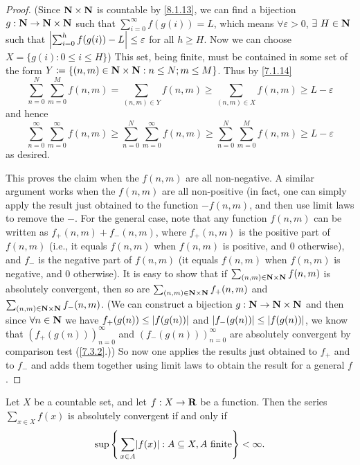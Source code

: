 \begin{proof}
  (Since \(\mathbf{N} \times \mathbf{N}\) is countable by \cref{8.1.13}, we can find a bijection \(g : \mathbf{N} \to \mathbf{N} \times \mathbf{N}\) such that \(\sum_{i = 0}^\infty f(g(i)) = L\), which means \(\forall \varepsilon > 0\), \(\exists\ H \in \mathbf{N}\) such that \(\left\lvert\sum_{i = 0}^h f(g(i)) - L\right\rvert \leq \varepsilon\) for all \(h \geq H\).
  Now we can choose \(X = \{g(i) : 0 \leq i \leq H\}\))
  This set, being finite, must be contained in some set of the form \(Y \coloneqq \{(n,m) \in \mathbf{N} \times \mathbf{N} : n \leq N; m \leq M \}\).
  Thus by \cref{7.1.14}
  \[
    \sum_{n = 0}^N \sum_{m = 0}^M f(n, m) = \sum_{(n, m) \in Y} f(n, m) \geq \sum_{(n, m) \in X} f(n, m) \geq L - \varepsilon
  \]
  and hence
  \[
    \sum_{n = 0}^\infty \sum_{m = 0}^\infty f(n, m) \geq \sum_{n = 0}^N \sum_{m = 0}^\infty f(n, m) \geq \sum_{n = 0}^N \sum_{m = 0}^M f(n, m) \geq L - \varepsilon
  \]
  as desired.

  This proves the claim when the \(f(n, m)\) are all non-negative.
  A similar argument works when the \(f(n, m)\) are all non-positive
  (in fact, one can simply apply the result just obtained to the function \(-f(n, m)\), and then use limit laws to remove the \(-\).
  For the general case, note that any function \(f(n, m)\) can be written as \(f_+(n, m) + f_-(n, m)\), where \(f_+(n, m)\) is the positive part of \(f(n, m)\)
  (i.e., it equals \(f(n, m)\) when \(f(n, m)\) is positive, and \(0\) otherwise),
  and \(f_-\) is the negative part of \(f(n, m)\)
  (it equals \(f(n, m)\) when \(f(n, m)\) is negative, and \(0\) otherwise).
  It is easy to show that if \(\sum_{(n, m) \in \mathbf{N} \times \mathbf{N}} f(n, m)\) is absolutely convergent, then so are \(\sum_{(n, m) \in \mathbf{N} \times \mathbf{N}} f_+(n, m)\) and \(\sum_{(n, m) \in \mathbf{N} \times \mathbf{N}} f_-(n, m)\).
  (We can construct a bijection \(g : \mathbf{N} \to \mathbf{N} \times \mathbf{N}\) and then since \(\forall n \in \mathbf{N}\) we have \(f_+(g(n)) \leq \left\lvert f(g(n))\right\rvert\) and \(\left\lvert f_-(g(n))\right\rvert \leq \left\lvert f(g(n))\right\rvert\), we know that \((f_+(g(n)))_{n = 0}^\infty\) and \((f_-(g(n)))_{n = 0}^\infty\) are absolutely convergent by comparison test (\cref{7.3.2}.))
  So now one applies the results just obtained to \(f_+\) and to \(f_-\) and adds them together using limit laws to obtain the result for a general \(f\).
\end{proof}

\begin{lemma}\label{8.2.3}
  Let \(X\) be a countable set, and let \(f : X \to \mathbf{R}\) be a function.
  Then the series \(\sum_{x \in X} f(x)\) is absolutely convergent if and only if
  \[
    \sup\Bigg\{\sum_{x \in A} \abs{f(x)} : A \subseteq X, A \text{ finite}\Bigg\} < \infty.
  \]
\end{lemma}

